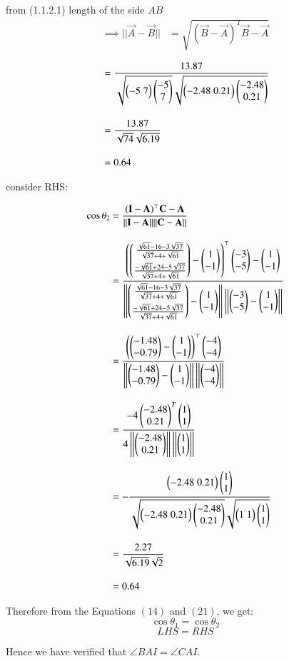 \documentclass[journal,12pt,twocolumn]{IEEEtran}
\theoremstyle{remark}
\begin{document}
from (1.1.2.1) length of the side $AB$
\begin{align}
\implies||\vec{A} - \vec{B}|| &= \sqrt{(\vec{B}-\vec{A})^T\vec{B}-\vec{A}}
\end{align}

\begin{align}
&= \frac{13.87}{\sqrt{\begin{pmatrix}-5\; 7\end{pmatrix}\begin{pmatrix}-5\\7\end{pmatrix}}\sqrt{\begin{pmatrix}-2.48\;0.21\end{pmatrix}\begin{pmatrix}-2.48\\0.21\end{pmatrix}}}\\[10pt]
&= \frac{13.87}{\sqrt{74}\sqrt{6.19}}\\[10pt]
&= 0.64
\end{align}

\newpage
consider RHS:

\begin{align}
\cos{\theta_2} &= \frac{(\mathbf{I} - \mathbf{A})^{\top}\mathbf{C} - \mathbf{A}}{||\mathbf{I} - \mathbf{A}|| || \mathbf{C} - \mathbf{A}||}\\[10pt]
&= \frac{\left(\begin{pmatrix}\frac{{\sqrt{61}-16-3\sqrt{37}}}{\sqrt{37}+4+\sqrt{61}}\\[6pt]\frac{{-\sqrt{61}+24-5\sqrt{37}}}{\sqrt{37}+4+\sqrt{61}}\end{pmatrix} - \begin{pmatrix}1\\-1\end{pmatrix}\right)^{\top}\begin{pmatrix}-3\\-5\end{pmatrix} - \begin{pmatrix}1\\-1\end{pmatrix}}{\left|\left|\begin{pmatrix}\frac{{\sqrt{61}-16-3\sqrt{37}}}{\sqrt{37}+4+\sqrt{61}}\\[6pt]\frac{{-\sqrt{61}+24-5\sqrt{37}}}{\sqrt{37}+4+\sqrt{61}}\end{pmatrix} - \begin{pmatrix}1\\-1\end{pmatrix}\right|\right| \left|\left| \begin{pmatrix}-3\\-5\end{pmatrix} - \begin{pmatrix}1\\-1\end{pmatrix}\right|\right|}\\[10pt]
&= \frac{\left(\begin{pmatrix}-1.48\\-0.79\end{pmatrix} - \begin{pmatrix}1\\-1\end{pmatrix}\right)^{\top}\begin{pmatrix}-4\\-4\end{pmatrix}}{\left|\left|\begin{pmatrix}-1.48\\-0.79\end{pmatrix} - \begin{pmatrix}1\\-1\end{pmatrix}\right|\right| \left|\left| \begin{pmatrix}-4\\-4\end{pmatrix}\right|\right|}\\[10pt]
&= \frac{-4\begin{pmatrix}-2.48\\0.21\end{pmatrix}^T\begin{pmatrix}1\\1\end{pmatrix}}{4\left|\left|\begin{pmatrix}-2.48\\0.21\end{pmatrix}\right|\right| \left|\left| \begin{pmatrix}1\\1\end{pmatrix}\right|\right|}\\[10pt]
&= -\frac{\begin{pmatrix}-2.48\;0.21\end{pmatrix}\begin{pmatrix}1\\1\end{pmatrix}}{\sqrt{\begin{pmatrix}-2.48\;0.21\end{pmatrix}\begin{pmatrix}-2.48\\0.21\end{pmatrix}}\sqrt{\begin{pmatrix}1\;1\end{pmatrix}\begin{pmatrix}1\\1\end{pmatrix}}}\\[10pt]
&= \frac{2.27}{\sqrt{6.19}\sqrt{2}}\\[10pt]
&= 0.64
\end{align}

Therefore from the Equations $(14)$ and $(21)$, we get:
$$\cos{\theta_1} = \cos{\theta_2}$$
$$LHS = RHS$$

Hence we have verified that $\angle BAI = \angle CAI$.
\end{document}
